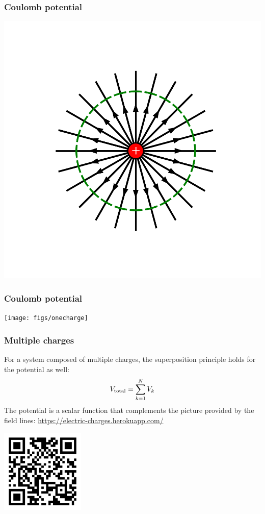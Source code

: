 \documentclass{beamer}
\begin{document}
\begin{frame}
\frametitle{Coulomb potential}
\begin{center}
	\includegraphics[width=0.75\columnwidth]{figs/seq/frame24}
\end{center}
\end{frame}





\begin{frame}
\frametitle{Coulomb potential}
\small
\begin{center}

	\texttt{[image: figs/onecharge]}
\end{center}

	
\end{frame}

\begin{frame}
	\frametitle{Multiple charges}
	
	For a system composed of multiple charges, the superposition principle holds for the potential as well:
	\begin{equation}
		V_{\rm total} =\sum_{k=1}^N V_k
	\end{equation}
	The potential is a scalar function that complements the picture provided by the field lines:\newline
	{\color{UniversityRed}\href{https://electric-charges.herokuapp.com/}{https://electric-charges.herokuapp.com/}}
	
	\includegraphics[width=0.3\textwidth]{figs/qr-code}
	
	
	\end{frame}
	
\end{document}
